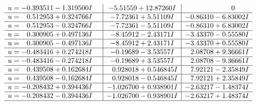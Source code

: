 \documentclass[1p]{elsarticle_modified}
\theoremstyle{definition}
\begin{document}
$$\begin{array}{c|c|c}
\begin{aligned}
u &= -0.393511 - 1.319500 I\end{aligned}
 & -5.51559 + 12.87260 I & \phantom{-0.000000 } 0 \\ \hline\begin{aligned}
u &= \phantom{-}0.512953 + 0.324766 I\end{aligned}
 & -7.72361 + 5.51109 I & -0.86310 - 6.83002 I \\ \hline\begin{aligned}
u &= \phantom{-}0.512953 - 0.324766 I\end{aligned}
 & -7.72361 - 5.51109 I & -0.86310 + 6.83002 I \\ \hline\begin{aligned}
u &= \phantom{-}0.300905 + 0.497136 I\end{aligned}
 & -8.45912 - 2.43171 I & -3.43370 - 0.55580 I \\ \hline\begin{aligned}
u &= \phantom{-}0.300905 - 0.497136 I\end{aligned}
 & -8.45912 + 2.43171 I & -3.43370 + 0.55580 I \\ \hline\begin{aligned}
u &= -0.483416 + 0.274218 I\end{aligned}
 & -0.19689 - 3.53557 I & \phantom{-}2.08708 + 9.36661 I \\ \hline\begin{aligned}
u &= -0.483416 - 0.274218 I\end{aligned}
 & -0.19689 + 3.53557 I & \phantom{-}2.08708 - 9.36661 I \\ \hline\begin{aligned}
u &= \phantom{-}0.439508 + 0.162684 I\end{aligned}
 & \phantom{-}0.928018 + 0.546845 I & \phantom{-}7.92121 - 2.35849 I \\ \hline\begin{aligned}
u &= \phantom{-}0.439508 - 0.162684 I\end{aligned}
 & \phantom{-}0.928018 - 0.546845 I & \phantom{-}7.92121 + 2.35849 I \\ \hline\begin{aligned}
u &= -0.208432 + 0.394436 I\end{aligned}
 & -1.026700 + 0.938901 I & -2.63217 - 1.48374 I \\ \hline\begin{aligned}
u &= -0.208432 - 0.394436 I\end{aligned}
 & -1.026700 - 0.938901 I & -2.63217 + 1.48374 I\\
 \hline 
 \end{array}$$\newpage
\end{document}
